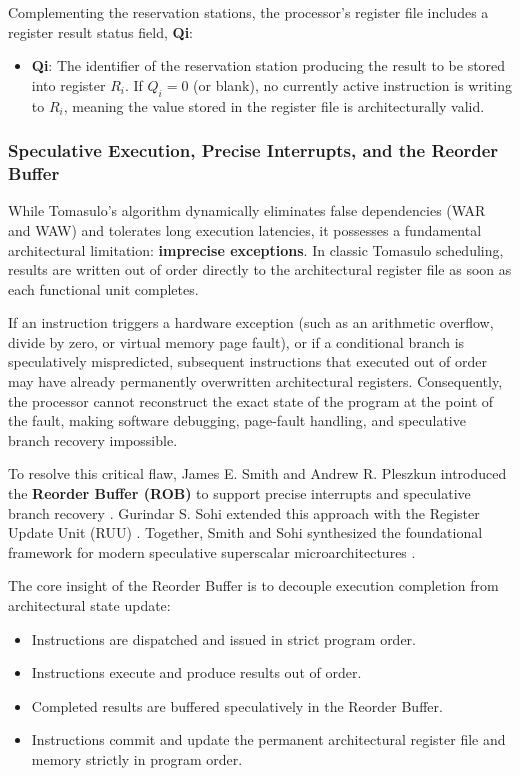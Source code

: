 Complementing the reservation stations, the processor's register file includes a register result status field, \textbf{Qi}:
\begin{itemize}
    \item \textbf{Qi}: The identifier of the reservation station producing the result to be stored into register $R_i$. If $Q_i = 0$ (or blank), no currently active instruction is writing to $R_i$, meaning the value stored in the register file is architecturally valid.
\end{itemize}

\subsubsection{Speculative Execution, Precise Interrupts, and the Reorder Buffer}\label{sec:rob}

While Tomasulo's algorithm dynamically eliminates false dependencies (WAR and WAW) and tolerates long execution latencies, it possesses a fundamental architectural limitation: \textbf{imprecise exceptions}. In classic Tomasulo scheduling, results are written out of order directly to the architectural register file as soon as each functional unit completes. 

If an instruction triggers a hardware exception (such as an arithmetic overflow, divide by zero, or virtual memory page fault), or if a conditional branch is speculatively mispredicted, subsequent instructions that executed out of order may have already permanently overwritten architectural registers. Consequently, the processor cannot reconstruct the exact state of the program at the point of the fault, making software debugging, page-fault handling, and speculative branch recovery impossible.

To resolve this critical flaw, James E. Smith and Andrew R. Pleszkun introduced the \textbf{Reorder Buffer (ROB)} to support precise interrupts and speculative branch recovery \cite{smith1988precise}. Gurindar S. Sohi extended this approach with the Register Update Unit (RUU) \cite{sohi1990instruction}. Together, Smith and Sohi synthesized the foundational framework for modern speculative superscalar microarchitectures \cite{smith1991}.

The core insight of the Reorder Buffer is to decouple execution completion from architectural state update:
\begin{itemize}
    \item Instructions are dispatched and issued in strict program order.
    \item Instructions execute and produce results out of order.
    \item Completed results are buffered speculatively in the Reorder Buffer.
    \item Instructions commit and update the permanent architectural register file and memory strictly in program order.
\end{itemize}

